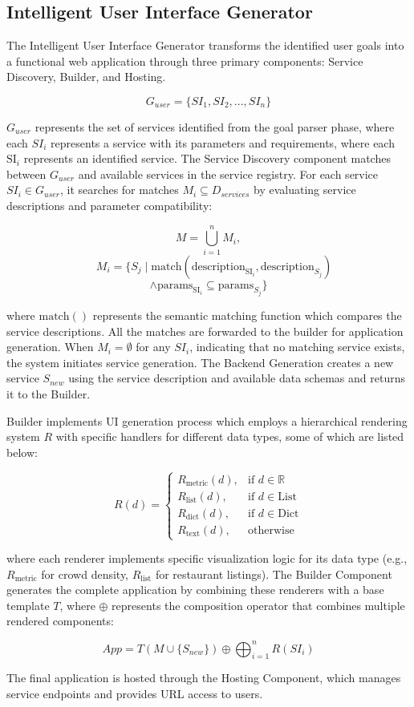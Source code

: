 \subsection{\textbf{Intelligent User Interface Generator}}

The Intelligent User Interface Generator transforms the identified user goals into a functional web application through three primary components: Service Discovery, Builder, and Hosting. 

\[
G_{user} = \{SI_1, SI_2, ..., SI_n\}
\]

$G_{user}$ represents the set of services identified from the goal parser phase, where each $SI_i$ represents a service with its parameters and requirements, where each $\text{SI}_i$ represents an identified service. The Service Discovery component matches between $G_{user}$ and available services in the service registry. For each service $SI_i \in G_{user}$, it searches for matches $M_i \subseteq D_{services}$ by evaluating service descriptions and parameter compatibility:



\[
M = \bigcup_{i=1}^{n} M_i,\]\[ \quad M_i = \{ S_j \mid \text{match}(\text{description}_{\text{SI}_i}, \text{description}_{S_j}) \]
\[\land \text{params}_{\text{SI}_i} \subseteq \text{params}_{S_j} \}
\]

where $\text{match}()$ represents the semantic matching function which compares the service descriptions. All the matches are forwarded to the builder for application generation. When $M_i = \emptyset$ for any $SI_i$, indicating that no matching service exists, the system initiates service generation. The Backend Generation creates a new service $S_{new}$ using the service description and available data schemas and returns it to the Builder.


Builder implements UI generation process which employs a hierarchical rendering system $R$ with specific handlers for different data types, some of which are listed below:

\[
R(d) = \begin{cases}
    R_{\text{metric}}(d), & \text{if } d \in \mathbb{R} \\
    R_{\text{list}}(d), & \text{if } d \in \text{List} \\
    R_{\text{dict}}(d), & \text{if } d \in \text{Dict} \\
    R_{\text{text}}(d), & \text{otherwise}
\end{cases}
\]

where each renderer implements specific visualization logic for its data type (e.g., $R_{\text{metric}}$ for crowd density, $R_{\text{list}}$ for restaurant listings). The Builder Component generates the complete application by combining these renderers with a base template $T$, where $\oplus$ represents the composition operator that combines multiple rendered components:



\[
App = T(M \cup \{S_{new}\}) \oplus \bigoplus_{i=1}^{n} R(SI_i)
\]












The final application is hosted through the Hosting Component, which manages service endpoints and provides URL access to users. 


